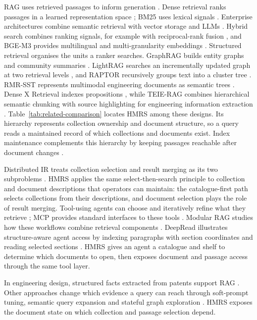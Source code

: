 RAG uses retrieved passages to inform generation
\citep{rag-lewis,gao-rag-survey-2023}. Dense
retrieval ranks passages in a learned representation space \citep{dpr}; BM25
uses lexical signals \citep{bm25}. Enterprise architectures combine semantic
retrieval with vector storage and LLMs \citep{ghali-kbs-retrieval-2025}.
Hybrid search combines ranking signals, for example with reciprocal-rank
fusion \citep{rrf-cormack}, and BGE-M3 provides multilingual and
multi-granularity embeddings \citep{bge-m3}. Structured retrieval organises
the units a ranker searches. GraphRAG builds entity graphs and community
summaries \citep{graphrag}. LightRAG searches an incrementally updated
graph at two retrieval levels \citep{lightrag}, and RAPTOR recursively
groups text into a cluster tree \citep{raptor}. RMR-SST represents multimodal engineering
documents as semantic trees \citep{li-kbs-rmrsst-2026}. Dense X Retrieval
indexes propositions \citep{chen2024dense}, while TEIE-RAG combines
hierarchical semantic chunking with source highlighting for engineering
information extraction \citep{shen-kbs-teierag-2026}.
Table~\ref{tab:related-comparison} locates HMRS among these designs. Its
hierarchy represents collection ownership and document structure, so a
query reads a maintained record of which collections and documents exist.
Index maintenance complements this hierarchy by keeping passages reachable
after document changes \citep{xu2023spfresh}.

Distributed IR treats collection selection and result merging as its two
subproblems \citep{callan1995searching,si2003redde,shokouhi-federated-2011}.
HMRS applies the same select-then-search principle to collection and
document descriptions that operators can maintain: the catalogue-first
path selects collections from their descriptions, and document selection
plays the role of result merging. Tool-using agents can choose and iteratively refine
what they retrieve \citep{react-yao,toolformer}; MCP provides standard
interfaces to these tools \citep{mcp}. Modular RAG studies how these
workflows combine retrieval components \citep{modular-rag}. DeepRead
illustrates structure-aware agent access by indexing paragraphs with section
coordinates and reading selected sections \citep{deepread}. HMRS gives
an agent a catalogue and shelf to determine which documents to open, then
exposes document and passage access through the same tool layer.

In engineering design, structured facts extracted from patents support RAG
\citep{siddharth2024retrieval}. Other approaches change which evidence a
query can reach through soft-prompt tuning, semantic query expansion and
stateful graph exploration
\citep{peng2024soft,massai2023evaluatio,tao2025fine}. HMRS exposes the document
state on which collection and passage selection depend.

